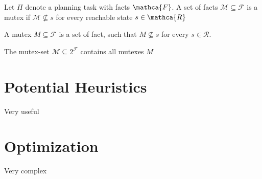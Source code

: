 \begin{definition}
    Let $\Pi$ denote a planning task with facts $\mathca{F}$.
    A set of facts $\mathcal{M}\subseteq \mathcal{F}$ is a mutex if $\mathcal{M}\nsubseteq s$ for every reachable state $s\in\mathca{R}$
\end{definition}
A mutex $M\subseteq\mathcal{F}$ is a set of fact, such that $M\nsubseteq s$ for every $s\in\mathcal{R}$.

The mutex-set $\mathcal{M}\subseteq 2^{\mathcal{F}}$ contains all mutexes $M$

\section{Potential Heuristics}
Very useful

\section{Optimization}
Very complex


